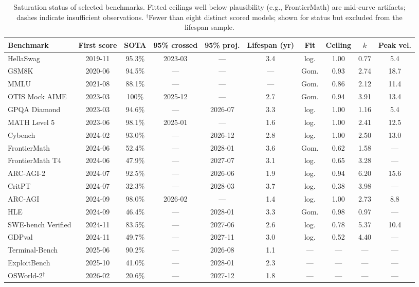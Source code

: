 \begin{table}[t]
\centering
\caption{Saturation status of selected benchmarks. Fitted ceilings well below plausibility (e.g., FrontierMath) are mid-curve artifacts; dashes indicate insufficient observations. $^\dagger$Fewer than eight distinct scored models; shown for status but excluded from the lifespan sample.}
\label{tab:benchmarks}
\small
\begin{tabular}{lccccccccc}
\toprule
Benchmark & First score & SOTA & 95\% crossed & 95\% proj. & Lifespan (yr) & Fit & Ceiling & $k$ & Peak vel. \\
\midrule
HellaSwag           & 2019-11 & 95.3\% & 2023-03 & ---     & 3.4 & log. & 1.00 & 0.77 & 5.4  \\
GSM8K               & 2020-06 & 94.5\% & ---     & ---     & --- & Gom. & 0.93 & 2.74 & 18.7 \\
MMLU                & 2021-08 & 88.1\% & ---     & ---     & --- & Gom. & 0.86 & 2.12 & 11.4 \\
OTIS Mock AIME      & 2023-03 & 100\%  & 2025-12 & ---     & 2.7 & Gom. & 0.94 & 3.91 & 13.4 \\
GPQA Diamond        & 2023-03 & 94.6\% & ---     & 2026-07 & 3.3 & log. & 1.00 & 1.16 & 5.4  \\
MATH Level 5        & 2023-06 & 98.1\% & 2025-01 & ---     & 1.6 & log. & 1.00 & 2.41 & 12.5 \\
Cybench             & 2024-02 & 93.0\% & ---     & 2026-12 & 2.8 & log. & 1.00 & 2.50 & 13.0 \\
FrontierMath        & 2024-06 & 52.4\% & ---     & 2028-01 & 3.6 & Gom. & 0.62 & 1.58 & ---  \\
FrontierMath T4     & 2024-06 & 47.9\% & ---     & 2027-07 & 3.1 & log. & 0.65 & 3.28 & ---  \\
ARC-AGI-2           & 2024-07 & 92.5\% & ---     & 2026-06 & 1.9 & log. & 0.94 & 6.20 & 15.6 \\
CritPT              & 2024-07 & 32.3\% & ---     & 2028-03 & 3.7 & log. & 0.38 & 3.98 & ---  \\
ARC-AGI             & 2024-09 & 98.0\% & 2026-02 & ---     & 1.4 & log. & 1.00 & 2.73 & 8.8  \\
HLE                 & 2024-09 & 46.4\% & ---     & 2028-01 & 3.3 & Gom. & 0.98 & 0.97 & ---  \\
SWE-bench Verified  & 2024-11 & 83.5\% & ---     & 2027-06 & 2.6 & log. & 0.78 & 5.37 & 10.4 \\
GDPval              & 2024-11 & 49.7\% & ---     & 2027-11 & 3.0 & log. & 0.52 & 4.40 & ---  \\
Terminal-Bench      & 2025-06 & 90.2\% & ---     & 2026-08 & 1.1 & ---  & ---  & ---  & ---  \\
ExploitBench        & 2025-10 & 41.0\% & ---     & 2028-01 & 2.3 & ---  & ---  & ---  & ---  \\
OSWorld-2$^\dagger$ & 2026-02 & 20.6\% & ---     & 2027-12 & 1.8 & ---  & ---  & ---  & ---  \\
\bottomrule
\end{tabular}
\end{table}
